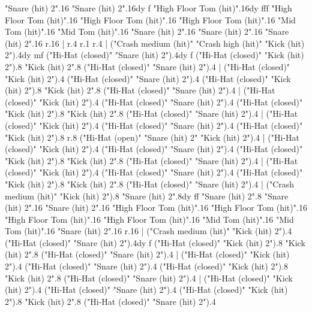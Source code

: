       "Snare (hit) 2".16
      "Snare (hit) 2".16{dy f}
      "High Floor Tom (hit)".16{dy fff}
      "High Floor Tom (hit)".16
      "High Floor Tom (hit)".16
      "High Floor Tom (hit)".16
      "Mid Tom (hit)".16
      "Mid Tom (hit)".16
      "Snare (hit) 2".16
      "Snare (hit) 2".16
      "Snare (hit) 2".16
      r.16
    |
      r.4
      r.1
      r.4
    |
      ("Crash medium (hit)" "Crash high (hit)" "Kick (hit) 2").4{dy mf}
      ("Hi-Hat (closed)" "Snare (hit) 2").4{dy f}
      ("Hi-Hat (closed)" "Kick (hit) 2").8
      "Kick (hit) 2".8
      ("Hi-Hat (closed)" "Snare (hit) 2").4
    |
      ("Hi-Hat (closed)" "Kick (hit) 2").4
      ("Hi-Hat (closed)" "Snare (hit) 2").4
      ("Hi-Hat (closed)" "Kick (hit) 2").8
      "Kick (hit) 2".8
      ("Hi-Hat (closed)" "Snare (hit) 2").4
    |
      ("Hi-Hat (closed)" "Kick (hit) 2").4
      ("Hi-Hat (closed)" "Snare (hit) 2").4
      ("Hi-Hat (closed)" "Kick (hit) 2").8
      "Kick (hit) 2".8
      ("Hi-Hat (closed)" "Snare (hit) 2").4
    |
      ("Hi-Hat (closed)" "Kick (hit) 2").4
      ("Hi-Hat (closed)" "Snare (hit) 2").4
      ("Hi-Hat (closed)" "Kick (hit) 2").8
      r.8
      ("Hi-Hat (open)" "Snare (hit) 2" "Kick (hit) 2").4
    |
      ("Hi-Hat (closed)" "Kick (hit) 2").4
      ("Hi-Hat (closed)" "Snare (hit) 2").4
      ("Hi-Hat (closed)" "Kick (hit) 2").8
      "Kick (hit) 2".8
      ("Hi-Hat (closed)" "Snare (hit) 2").4
    |
      ("Hi-Hat (closed)" "Kick (hit) 2").4
      ("Hi-Hat (closed)" "Snare (hit) 2").4
      ("Hi-Hat (closed)" "Kick (hit) 2").8
      "Kick (hit) 2".8
      ("Hi-Hat (closed)" "Snare (hit) 2").4
    |
      ("Crash medium (hit)" "Kick (hit) 2").8
      "Snare (hit) 2".8{dy ff}
      "Snare (hit) 2".8
      "Snare (hit) 2".16
      "Snare (hit) 2".16
      "High Floor Tom (hit)".16
      "High Floor Tom (hit)".16
      "High Floor Tom (hit)".16
      "High Floor Tom (hit)".16
      "Mid Tom (hit)".16
      "Mid Tom (hit)".16
      "Snare (hit) 2".16
      r.16
    |
      ("Crash medium (hit)" "Kick (hit) 2").4
      ("Hi-Hat (closed)" "Snare (hit) 2").4{dy f}
      ("Hi-Hat (closed)" "Kick (hit) 2").8
      "Kick (hit) 2".8
      ("Hi-Hat (closed)" "Snare (hit) 2").4
    |
      ("Hi-Hat (closed)" "Kick (hit) 2").4
      ("Hi-Hat (closed)" "Snare (hit) 2").4
      ("Hi-Hat (closed)" "Kick (hit) 2").8
      "Kick (hit) 2".8
      ("Hi-Hat (closed)" "Snare (hit) 2").4
    |
      ("Hi-Hat (closed)" "Kick (hit) 2").4
      ("Hi-Hat (closed)" "Snare (hit) 2").4
      ("Hi-Hat (closed)" "Kick (hit) 2").8
      "Kick (hit) 2".8
      ("Hi-Hat (closed)" "Snare (hit) 2").4
